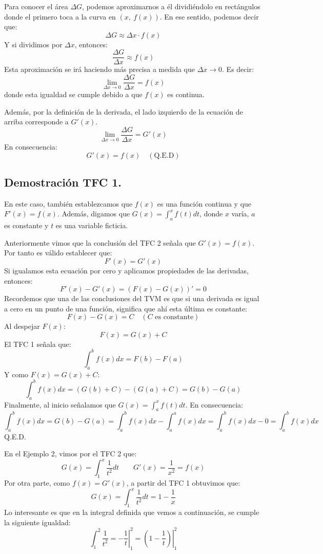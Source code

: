 \documentclass[12pt]{article}
\begin{document}
Para conocer el área $\Delta G$, podemos aproximarnos a él dividiéndolo en rectángulos donde el primero toca a la curva en $(x, \ f(x))$. En ese sentido, podemos decir que:
\[
  \Delta G \approx \Delta x \cdot f(x)
\]
Y si dividimos por $\Delta x$, entonces:
\[
  \frac{\Delta G}{\Delta x} \approx f(x)
\]
Esta aproximación se irá haciendo más precisa a medida que $\Delta x \to 0$. Es decir:
\[
  \lim_{\Delta x \to 0} \frac{\Delta G}{\Delta x} = f(x)
\]
donde esta igualdad se cumple debido a que $f(x)$ es continua.

Además, por la definición de la derivada, el lado izquierdo de la ecuación de arriba corresponde a $G'(x)$.
\[
  \lim_{\Delta x \to 0} \frac{\Delta G}{\Delta x} = G'(x)
\]
En consecuencia:
\[
  G'(x) = f(x) \quad (\text{Q.E.D})
\]

\subsection{Demostración TFC 1.}

En este caso, también establezcamos que $f(x)$ es una función continua y que $F'(x) = f(x)$. Además, digamos que $G(x) = \int_{a}^{x} f(t)dt$, donde $x$ varía, $a$ es constante y $t$ es una variable ficticia.

Anteriormente vimos que la conclusión del TFC 2 señala que $G'(x) = f(x)$. Por tanto es válido establecer que:
\[
  F'(x) = G'(x)
\]
Si igualamos esta ecuación por cero y aplicamos propiedades de las derivadas, entonces:
\[
  F'(x) - G'(x) = (F(x) - G(x))' = 0
\]
Recordemos que una de las conclusiones del TVM es que si una derivada es igual a cero en un punto de una función, significa que ahí esta última es constante:
\[
  F(x) - G(x) = C \quad (C \text{ es constante})
\]
Al despejar $F(x)$:
\[
  F(x) = G(x) + C
\]
El TFC 1 señala que:
\[
  \int_{a}^{b} f(x)dx = F(b) - F(a)
\]
Y como $F(x) = G(x) + C$:
\[
  \int_{a}^{b} f(x)dx = (G(b) + C) - (G(a) + C) = G(b) - G(a)
\]
Finalmente, al inicio señalamos que $G(x) = \int_{a}^{x} f(t)dt$. En consecuencia:
\[
  \int_{a}^{b} f(x)dx = G(b) - G(a)
                      = \int_{a}^{b} f(x)dx - \int_{a}^{a} f(x)dx
                      = \int_{a}^{b} f(x)dx - 0
                      = \int_{a}^{b} f(x)dx
\]
Q.E.D.

En el Ejemplo 2, vimos por el TFC 2 que:
\[
  G(x) = \int_{1}^{x} \frac{1}{t^{2}} dt \qquad G'(x) = \frac{1}{x^{2}} = f(x)
\]
Por otra parte, como $f(x) = G'(x)$, a partir del TFC 1 obtuvimos que:
\[
  G(x) = \int_{1}^{x} \frac{1}{t^{2}} dt = 1 - \frac{1}{x}
\]
Lo interesante es que en la integral definida que vemos a continuación, se cumple la siguiente igualdad:
\[
  \int_{1}^{2} \frac{1}{t^{2}} = \left.-\frac{1}{t}\right|_{1}^{2}
                               = \left.\left(1 - \frac{1}{t}\right)\right|_{1}^{2}
\]
\end{document}

